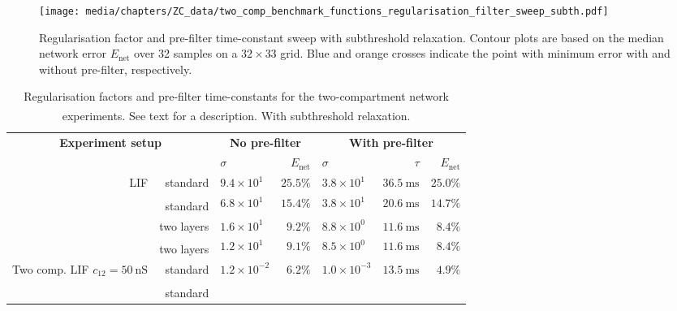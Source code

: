 \begin{figure}[p]
	\texttt{[image: media/chapters/ZC\_data/two\_comp\_benchmark\_functions\_regularisation\_filter\_sweep\_subth.pdf]}
	\caption[Regularisation factor and pre-filter time-constant sweep with subthreshold relaxation]{Regularisation factor and pre-filter time-constant sweep with subthreshold relaxation. Contour plots are based on the median network error $E_\mathrm{net}$ over 32 samples on a $32 \times 33$ grid. Blue and orange crosses indicate the point with minimum error with and without pre-filter, respectively.}
	\label{fig:regularization_parameter_sweep_subth}
\end{figure}

\begin{table}
	\caption[Regularisation factors and pre-filter time-constants]{Regularisation factors and pre-filter time-constants for the two-compartment \LIF network experiments. See text for a description.
	\textsuperscript{\dag}With subthreshold relaxation.
	}
	\label{tbl:regularization_paremteters}
	\centering
	\small
	\setlength{\tabcolsep}{10.75pt}
	\sffamily
	\begin{tabular}{r r l r l r r}
		\toprule
		\multicolumn{2}{c}{\textbf{Experiment setup}} &
		\multicolumn{2}{c}{\textbf{No pre-filter}} &
		\multicolumn{3}{c}{\textbf{With pre-filter}} \\
		\cmidrule{1-2}\cmidrule(l){3-4}\cmidrule(l){5-7}
		& & $\sigma$ & $E_\mathrm{net}$ & $\sigma$ & $\tau$ & $E_\mathrm{net}$ \\
		\midrule
		\multirow{4}{2.7cm}[-0.5em]{\raggedleft LIF}
			& standard
			& $9.4 \times 10^{1}$ & $25.5\%$
			& $3.8 \times 10^{1}$ & $\SI{36.5}{\milli\second}$ & $25.0\%$ \\
			& standard\textsuperscript{\dag}
			& $6.8 \times 10^{1}$ & $15.4\%$
			& $3.8 \times 10^{1}$ & $\SI{20.6}{\milli\second}$ & $14.7\%$ \\
		\cmidrule{2-7}
			& two layers
			& $1.6 \times 10^{1}$ & $9.2\%$
			& $8.8 \times 10^{0}$ & $\SI{11.6}{\milli\second}$ & $8.4\%$ \\
			& two layers\textsuperscript{\dag}
			& $1.2 \times 10^{1}$ & $9.1\%$
			& $8.5 \times 10^{0}$ & $\SI{11.6}{\milli\second}$ & $8.4\%$ \\
		\midrule
		\multirow{4}{2.7cm}[-0.5em]{\raggedleft Two comp. LIF $c_{12} = \SI{50}{\nano\siemens}$}
			& standard
			& $1.2 \times 10^{-2}$ & $6.2\%$
			& $1.0 \times 10^{-3}$ & $\SI{13.5}{\milli\second}$ & $4.9\%$ \\
			& standard\textsuperscript{\dag}

\end{tabular}
\end{table}
